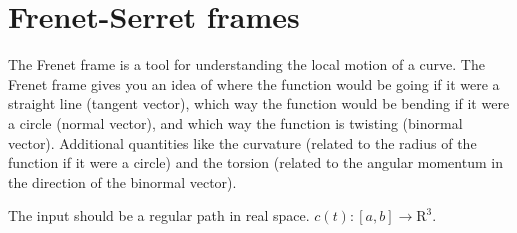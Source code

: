 \section{Frenet-Serret frames}

The Frenet frame is a tool for understanding the local motion of a curve. The Frenet frame gives you an idea of where the function would be going if it were a straight line (tangent vector), which way the function would be bending if it were a circle (normal vector), and which way the function is twisting (binormal vector). Additional quantities like the curvature (related to the radius of the function if it were a circle) and the torsion (related to the angular momentum in the direction of the binormal vector).

The input should be a regular path in real space. \(c(t) : [a, b] \to \mathrm R^3\).


